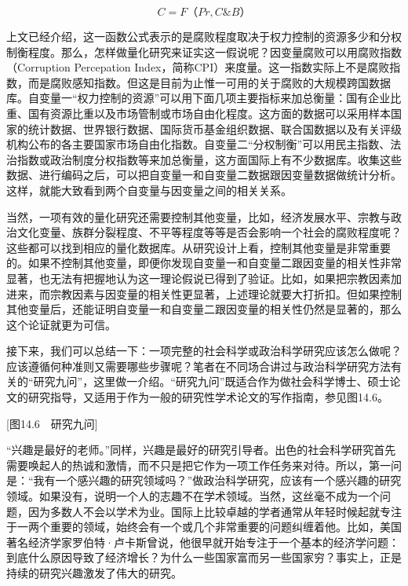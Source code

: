 \[C=F（Pr, C\&B）\]

上文已经介绍，这一函数公式表示的是腐败程度取决于权力控制的资源多少和分权制衡程度。那么，怎样做量化研究来证实这一假说呢？因变量腐败可以用腐败指数（Corruption Percepation Index，简称CPI）来度量。这一指数实际上不是腐败指数，而是腐败感知指数。但这是目前为止惟一可用的关于腐败的大规模跨国数据库。自变量一“权力控制的资源”可以用下面几项主要指标来加总衡量：国有企业比重、国有资源比重以及市场管制或市场自由化程度。这方面的数据可以采用样本国家的统计数据、世界银行数据、国际货币基金组织数据、联合国数据以及有关评级机构公布的各主要国家市场自由化指数。自变量二“分权制衡”可以用民主指数、法治指数或政治制度分权指数等来加总衡量，这方面国际上有不少数据库。收集这些数据、进行编码之后，可以把自变量一和自变量二数据跟因变量数据做统计分析。这样，就能大致看到两个自变量与因变量之间的相关关系。

当然，一项有效的量化研究还需要控制其他变量，比如，经济发展水平、宗教与政治文化变量、族群分裂程度、不平等程度等等是否会影响一个社会的腐败程度呢？这些都可以找到相应的量化数据库。从研究设计上看，控制其他变量是非常重要的。如果不控制其他变量，即便你发现自变量一和自变量二跟因变量的相关性非常显著，也无法有把握地认为这一理论假说已得到了验证。比如，如果把宗教因素加进来，而宗教因素与因变量的相关性更显著，上述理论就要大打折扣。但如果控制其他变量后，还能证明自变量一和自变量二跟因变量的相关性仍然是显著的，那么这个论证就更为可信。


接下来，我们可以总结一下：一项完整的社会科学或政治科学研究应该怎么做呢？应该遵循何种准则又需要哪些步骤呢？笔者在不同场合讲过与政治科学研究方法有关的“研究九问”，这里做一介绍。“研究九问”既适合作为做社会科学博士、硕士论文的研究指导，又适用于作为一般的研究性学术论文的写作指南，参见图14.6。

[图14.6　研究九问]

“兴趣是最好的老师。”同样，兴趣是最好的研究引导者。出色的社会科学研究首先需要唤起人的热诚和激情，而不只是把它作为一项工作任务来对待。所以，第一问是：“我有一个感兴趣的研究领域吗？”做政治科学研究，应该有一个感兴趣的研究领域。如果没有，说明一个人的志趣不在学术领域。当然，这丝毫不成为一个问题，因为多数人不会以学术为业。国际上比较卓越的学者通常从年轻时候起就专注于一两个重要的领域，始终会有一个或几个非常重要的问题纠缠着他。比如，美国著名经济学家罗伯特·卢卡斯曾说，他很早就开始专注于一个基本的经济学问题：到底什么原因导致了经济增长？为什么一些国家富而另一些国家穷？事实上，正是持续的研究兴趣激发了伟大的研究。

